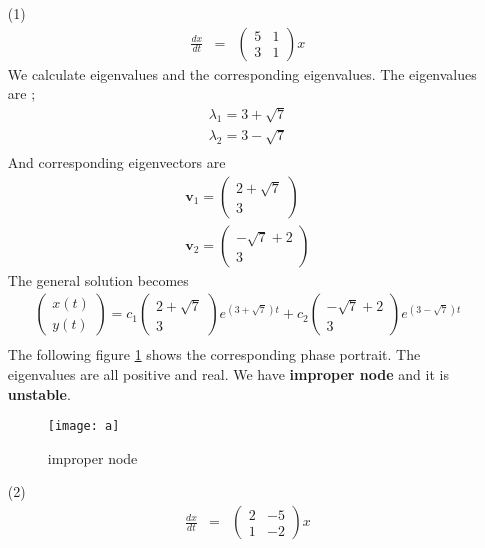 \documentclass[12pt,a4paper]{article}
\begin{document}
\begin{enumerate}
\item[(1)]
\begin{eqnarray*}
\frac{dx}{dt}&=&\begin{pmatrix}
5 & 1 \\
3& 1 
\end{pmatrix}x
\end{eqnarray*}
We calculate eigenvalues and the corresponding eigenvalues.
The eigenvalues are ;
\begin{eqnarray*}
\lambda_1=3+\sqrt{7}\\
\lambda_2=3-\sqrt{7}\\
\end{eqnarray*}
And corresponding eigenvectors are
\begin{eqnarray*}
\textbf{v}_1=\begin{pmatrix}
2+ \sqrt{7}\\
3 
\end{pmatrix}\\
\textbf{v}_2=\begin{pmatrix}
- \sqrt{7}+2\\
 3
\end{pmatrix}
\end{eqnarray*}
The general solution becomes
\begin{eqnarray*}
\begin{pmatrix}
x(t) \\
y(t)
\end{pmatrix}=c_1 \begin{pmatrix}
2+ \sqrt{7}\\
3 
\end{pmatrix}e^{(3+\sqrt{7})t}+c_2 \begin{pmatrix}
 - \sqrt{7}+2\\
 3
\end{pmatrix}e^{(3-\sqrt{7})t}\\
\end{eqnarray*}
The following figure \ref{fig 1} shows the corresponding phase portrait. The eigenvalues are all positive and real. We have \textbf{improper node} and it is \textbf{unstable}.
\begin{figure}[H]
\texttt{[image: a]}
\centering
\caption{improper node}
\label{fig 1}
\end{figure}
\item[(2)]
\begin{eqnarray*}
\frac{dx}{dt}&=&\begin{pmatrix}
2 & -5 \\
1& -2
\end{pmatrix}x
\end{eqnarray*}



\end{enumerate}
\end{document}
